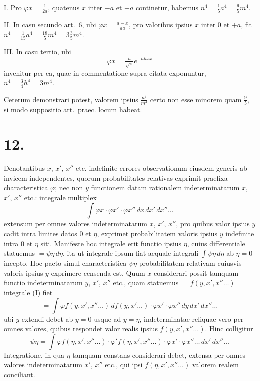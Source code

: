 \documentclass[12pt,a4paper]{book}
\begin{document}
\textsc{I.} Pro $\varphi x=\tfrac{1}{2a}$, quatenus $x$ inter $-a$ et $+a$ continetur, habemus $n^4=\tfrac{1}{5}a^4=\tfrac{9}{5}m^4$.

\textsc{II.} In casu secundo art.~6, ubi $\varphi x=\tfrac{a-x}{aa}$, pro valoribus ipsius $x$ inter $0$ et $+a$, fit $n^4=\tfrac{1}{15}a^4=\tfrac{18}{5}m^4=3\tfrac{3}{5}m^4$.

\textsc{III.} In casu tertio, ubi
%
\begin{equation*}
\varphi x = \tfrac{h}{\sqrt{\pi}}e^{-hhxx}
\end{equation*}
invenitur per ea, quae in commentatione supra citata exponuntur, $n^4=\tfrac{3}{4}h^4=3m^4$.

Ceterum demonstrari potest, valorem ipsius $\tfrac{n^4}{m^4}$ certo non esse minorem quam $\tfrac{9}{5}$, si modo suppositio art.~praec. locum habeat.

\section*{12.}
\label{sec:art12}

Denotantibus $x$, $x'$, $x''$ etc. indefinite errores observationum eiusdem generis ab invicem independentes, quorum probabilitates relativas exprimit praefixa characteristica $\varphi$; nec non $y$ functionem datam rationalem indeterminatarum $x$, $x'$, $x''$ etc.: integrale multiplex
%
\begin{equation*}
\int\varphi x\cdot\varphi x'\cdot\varphi x''\,dx\,dx'\,dx''\ldots\tag{I}
\end{equation*}
extensum per omnes valores indeterminatarum $x$, $x'$, $x''$, pro quibus valor ipsius $y$ cadit intra limites datos $0$ et $\eta$, exprimet probabilitatem valoris ipsius $y$ indefinite intra $0$ et $\eta$ siti. Manifeste hoc integrale erit functio ipsius $\eta$, cuius differentiale statuemus $=\psi\eta\,d\eta$, ita ut integrale ipsum fiat aequale integrali $\int\psi\eta\,d\eta$ ab $\eta=0$ incepto. Hoc pacto simul characteristica $\psi\eta$ probabilitatem relativam cuiusvis valoris ipsius $y$ exprimere censenda est. Quum $x$ considerari possit tamquam functio indeterminatarum $y$, $x'$, $x''$ etc., quam statuemus $=f(y,x',x''\ldots)$ integrale (I) fiet
%
\begin{equation*}
=\int\varphi f(y,x',x''\ldots)\,df(y,x'\ldots)\cdot\varphi x'\cdot\varphi x''\,dy\,dx'\,dx''\ldots
\end{equation*}
ubi $y$ extendi debet ab $y=0$ usque ad $y=\eta$, indeterminatae reliquae vero per omnes valores, quibus respondet valor realis ipsius $f(y,x',x''\ldots)$. Hinc colligitur
%
\begin{equation*}
\psi\eta=\int\varphi f(\eta,x',x''\ldots)\cdot\varphi' f(\eta,x',x''\ldots)\cdot\varphi x'\cdot\varphi x''\ldots\,dx'\,dx''\ldots
\end{equation*}
Integratione, in qua $\eta$ tamquam constans considerari debet, extensa per omnes valores indeterminatarum $x'$, $x''$ etc., qui ipsi $f(\eta,x',x''\ldots)$ valorem realem conciliant.
\end{document}
